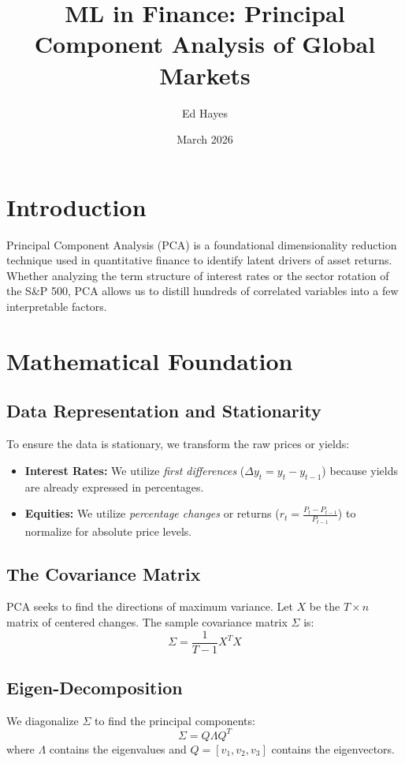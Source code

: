 \documentclass[11pt]{article}
\title{ML in Finance: Principal Component Analysis of Global Markets}
\author{Ed Hayes}
\date{March 2026}
\begin{document}
\maketitle

\tableofcontents
\newpage
{}

\section{Introduction}
Principal Component Analysis (PCA) is a foundational dimensionality reduction technique used in quantitative finance to identify latent drivers of asset returns. Whether analyzing the term structure of interest rates or the sector rotation of the S\&P 500, PCA allows us to distill hundreds of correlated variables into a few interpretable factors.

\section{Mathematical Foundation}
\subsection{Data Representation and Stationarity}
To ensure the data is stationary, we transform the raw prices or yields:
\begin{itemize}
    \item \textbf{Interest Rates:} We utilize \textit{first differences} ($\Delta y_{t}=y_{t}-y_{t-1}$) because yields are already expressed in percentages.
    \item \textbf{Equities:} We utilize \textit{percentage changes} or returns ($r_{t}=\frac{P_{t}-P_{t-1}}{P_{t-1}}$) to normalize for absolute price levels.
\end{itemize}

\subsection{The Covariance Matrix}
PCA seeks to find the directions of maximum variance. Let $X$ be the $T \times n$ matrix of centered changes. The sample covariance matrix $\Sigma$ is:
\[ \Sigma=\frac{1}{T-1}X^{T}X \]

\subsection{Eigen-Decomposition}
We diagonalize $\Sigma$ to find the principal components:
\[ \Sigma=Q\Lambda Q^{T} \]
where $\Lambda$ contains the eigenvalues and $Q=[v_{1},v_{2},v_{3}]$ contains the eigenvectors.
\end{document}
